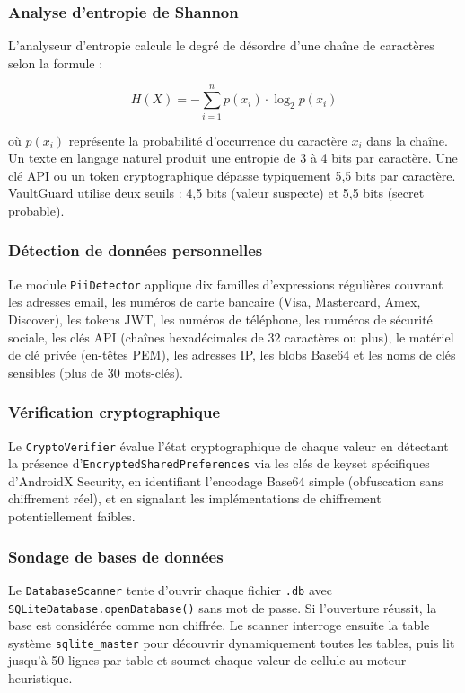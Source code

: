 \documentclass[preprint,12pt, a4paper]{elsarticle}
\begin{document}
\subsubsection{Analyse d'entropie de Shannon}

L'analyseur d'entropie calcule le degré de désordre d'une chaîne de caractères selon la formule :

\begin{equation}
H(X) = -\sum_{i=1}^{n} p(x_i) \cdot \log_2 p(x_i)
\end{equation}

où $p(x_i)$ représente la probabilité d'occurrence du caractère $x_i$ dans la chaîne. Un texte en langage naturel produit une entropie de 3 à 4 bits par caractère. Une clé API ou un token cryptographique dépasse typiquement 5,5 bits par caractère. VaultGuard utilise deux seuils : 4,5 bits (valeur suspecte) et 5,5 bits (secret probable).

\subsubsection{Détection de données personnelles}

Le module \texttt{PiiDetector} applique dix familles d'expressions régulières couvrant les adresses email, les numéros de carte bancaire (Visa, Mastercard, Amex, Discover), les tokens JWT, les numéros de téléphone, les numéros de sécurité sociale, les clés API (chaînes hexadécimales de 32 caractères ou plus), le matériel de clé privée (en-têtes PEM), les adresses IP, les blobs Base64 et les noms de clés sensibles (plus de 30 mots-clés).

\subsubsection{Vérification cryptographique}

Le \texttt{CryptoVerifier} évalue l'état cryptographique de chaque valeur en détectant la présence d'\texttt{EncryptedSharedPreferences} via les clés de keyset spécifiques d'AndroidX Security, en identifiant l'encodage Base64 simple (obfuscation sans chiffrement réel), et en signalant les implémentations de chiffrement potentiellement faibles.

\subsubsection{Sondage de bases de données}

Le \texttt{DatabaseScanner} tente d'ouvrir chaque fichier \texttt{.db} avec \texttt{SQLiteDatabase.openDatabase()} sans mot de passe. Si l'ouverture réussit, la base est considérée comme non chiffrée. Le scanner interroge ensuite la table système \texttt{sqlite\_master} pour découvrir dynamiquement toutes les tables, puis lit jusqu'à 50 lignes par table et soumet chaque valeur de cellule au moteur heuristique.
\end{document}
